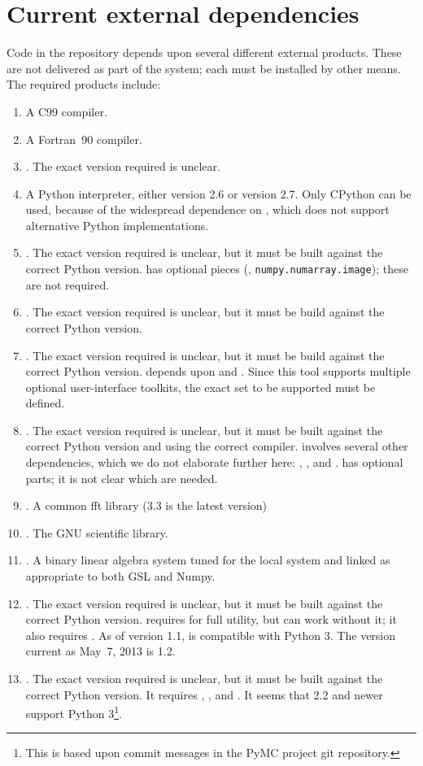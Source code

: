 \documentclass[draftmode,draftwater]{memarticle}
\newcommand{\despipe}{\name{des-pipe}\xspace}
\begin{document}
\section{Current external dependencies}

Code in the \despipe repository depends upon several different
external products. These are not delivered as part of the
\despipe system; each must be installed by other means. The
required products include:
\begin{enumerate}
\item A C99 compiler.
\item A Fortran~90 compiler.
\item {}. The exact version required is unclear.
\item A Python interpreter, either version 2.6 or version 2.7. Only
  CPython can be used, because of the widespread dependence on
  , which does not support alternative Python
  implementations.
\item {}. The exact version required is unclear, but it must
  be built against the correct Python version.  has optional
  pieces (\eg, \texttt{numpy.numarray.image}); these are not required.
\item {}. The exact version required is unclear, but it must
  be build against the correct Python version.
\item {}. The exact version required is unclear, but it
  must be build against the correct Python version. 
  depends upon  and . Since this tool
  supports multiple optional user-interface toolkits, the exact set to
  be supported must be defined.
\item {}. The exact version required is unclear, but it must
  be built against the correct Python version and using the correct
  \cpp{} compiler.  involves several other dependencies,
  which we do not elaborate further here: ,
  , and .  has optional parts; it is
  not clear which are needed.
\item {}. A common fft library (3.3 is the latest version)
\item {}.  The GNU scientific library.
\item {}. A binary linear algebra system tuned for the local
  system and linked as appropriate to both GSL and Numpy.
\item {}. The exact version required is unclear, but it must
  be built against the correct Python version.  requires
   for full utility, but can work without it; it also
  requires . As of version 1.1,  is compatible
  with Python 3. The version current as May~7, 2013 is 1.2.
\item {}. The exact version required is unclear, but it must be
  built against the correct Python version. It requires ,
  , and . It seems that  2.2 and
  newer support Python 3\footnote{This is based upon commit messages in
    the PyMC project git repository.}.
\end{enumerate}
\end{document}
